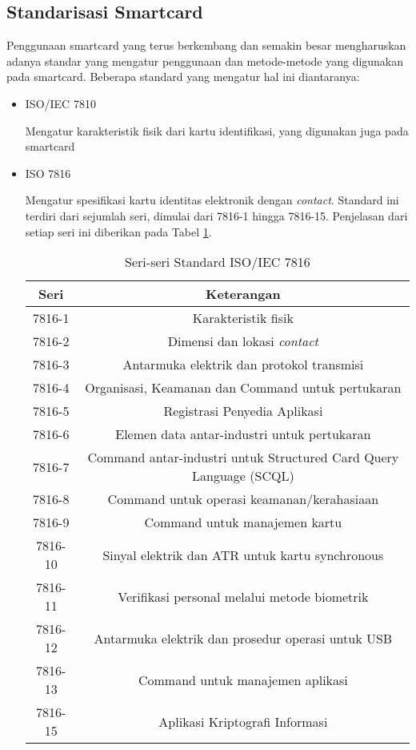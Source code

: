 \documentclass[a4paper, 12pt]{report}
\begin{document}
\subsection{Standarisasi Smartcard}

Penggunaan smartcard yang terus berkembang dan semakin besar mengharuskan adanya standar yang mengatur penggunaan dan metode-metode yang digunakan pada smartcard. Beberapa standard yang mengatur hal ini diantaranya:

\begin{itemize}

\item ISO/IEC 7810 

Mengatur karakteristik fisik dari kartu identifikasi, yang digunakan juga pada smartcard

\item ISO 7816

Mengatur spesifikasi kartu identitas elektronik dengan \emph{contact}. Standard ini terdiri dari sejumlah seri, dimulai dari 7816-1 hingga 7816-15. Penjelasan dari setiap seri ini diberikan pada Tabel \ref{tabel-standard-7816}.

\begin{table}[!h]
  \centering
  \begin{tabular}{ | c | c |}
    \hline
    \bf{Seri} & \bf{Keterangan} \\
    \hline
    7816-1 & Karakteristik fisik \\
    7816-2 & Dimensi dan lokasi \emph{contact} \\
    7816-3 & Antarmuka elektrik dan protokol transmisi \\
    7816-4 & Organisasi, Keamanan dan Command untuk pertukaran \\
    7816-5 & Registrasi Penyedia Aplikasi \\
    7816-6 & Elemen data antar-industri untuk pertukaran \\
    7816-7 & Command antar-industri untuk Structured Card Query Language (SCQL) \\
    7816-8 & Command untuk operasi keamanan/kerahasiaan \\
    7816-9 & Command untuk manajemen kartu \\
    7816-10 & Sinyal elektrik dan ATR untuk kartu synchronous \\
    7816-11 & Verifikasi personal melalui metode biometrik \\
    7816-12 & Antarmuka elektrik dan prosedur operasi untuk USB \\
    7816-13 & Command untuk manajemen aplikasi \\
    7816-15 & Aplikasi Kriptografi Informasi \\
    \hline
  \end{tabular}
  \caption{Seri-seri Standard ISO/IEC 7816}
  \label{tabel-standard-7816}
\end{table}


\end{itemize}
\end{document}
